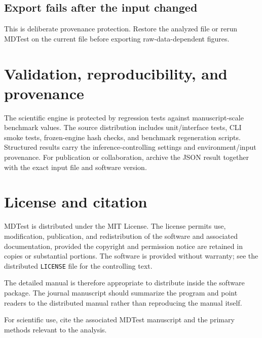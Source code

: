 \documentclass[11pt,oneside]{report}
\begin{document}
\section{Export fails after the input changed}
This is deliberate provenance protection. Restore the analyzed file or rerun MDTest on the current file before exporting raw-data-dependent figures.

\chapter{Validation, reproducibility, and provenance}
The scientific engine is protected by regression tests against manuscript-scale benchmark values. The source distribution includes unit/interface tests, CLI smoke tests, frozen-engine hash checks, and benchmark regeneration scripts. Structured results carry the inference-controlling settings and environment/input provenance. For publication or collaboration, archive the JSON result together with the exact input file and software version.

\chapter{License and citation}
MDTest is distributed under the MIT License. The license permits use, modification, publication, and redistribution of the software and associated documentation, provided the copyright and permission notice are retained in copies or substantial portions. The software is provided without warranty; see the distributed \texttt{LICENSE} file for the controlling text.

The detailed manual is therefore appropriate to distribute inside the software package. The journal manuscript should summarize the program and point readers to the distributed manual rather than reproducing the manual itself.

For scientific use, cite the associated MDTest manuscript and the primary methods relevant to the analysis.

\appendix
\end{document}
